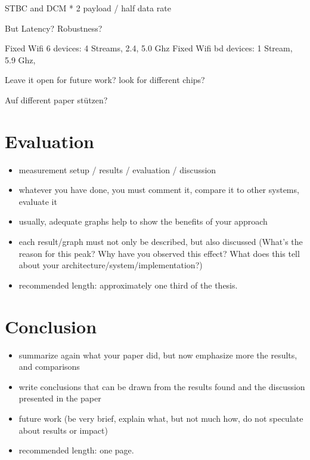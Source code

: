 \documentclass[]{nsm-thesis}
\begin{document}
STBC and DCM * 2 payload / half data rate

But Latency? 
Robustness?

Fixed Wifi 6 devices: 4 Streams, 2.4, 5.0 Ghz
Fixed Wifi bd devices: 1 Stream, 5.9 Ghz, 

Leave it open for future work?
look for different chips?

Auf different paper stützen? 


\chapter{Evaluation}


\begin{itemize}
\item measurement setup / results / evaluation / discussion
\item whatever you have done, you must comment it, compare it to other systems, evaluate it
\item usually, adequate graphs help to show the benefits of your approach
\item each result/graph must not only be described, but also discussed (What's the reason for this peak? Why have you observed this effect? What does this tell about your architecture/system/implementation?)
\item recommended length: approximately one third of the thesis.
\end{itemize}



\chapter{Conclusion}


\begin{itemize}
\item summarize again what your paper did, but now emphasize more the results, and comparisons
\item write conclusions that can be drawn from the results found and the discussion presented in the paper
\item future work (be very brief, explain what, but not much how, do not speculate about results or impact)
\item recommended length: one page.
\end{itemize}



\cleardoublepage

\listofabbreviations
\clearpage

\listoffigures
\clearpage

\listoftables
\clearpage

\printbibliography
\end{document}

